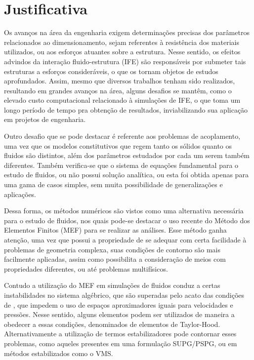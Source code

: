 \section{Justificativa}

Os avanços na área da engenharia exigem determinações precisas dos parâmetros relacionados ao dimensionamento, sejam referentes à resistência dos materiais utilizados, ou aos esforços atuantes sobre a estrutura. Nesse sentido, os efeitos advindos da interação fluido-estrutura (IFE) são responsáveis por submeter tais estruturas a esforços consideráveis, o que os tornam objetos de estudos aprofundados. Assim, mesmo que diversos trabalhos tenham sido realizados, resultando em grandes avanços na área, alguns desafios se mantêm, como o elevado custo computacional relacionado à simulações de IFE, o que toma um longo período de tempo pra obtenção de resultados, inviabilizando sua aplicação em projetos de engenharia.

Outro desafio que se pode destacar é referente aos problemas de acoplamento, uma vez que os modelos constitutivos que regem tanto os sólidos quanto os fluidos são distintos, além dos parâmetros estudados por cada um serem também diferentes. Também verifica-se que o sistema de equações fundamental para o estudo de fluidos, ou não possui solução analítica, ou esta foi obtida apenas para uma gama de casos simples, sem muita possibilidade de generalizações e aplicações.

Dessa forma, os métodos numéricos são vistos como uma alternativa necessária para o estudo de fluidos, nos quais pode-se destacar o uso recente do Método dos Elementos Finitos (MEF) para se realizar as análises. Esse método ganha atenção, uma vez que possui a propriedade de se adequar com certa facilidade à problemas de geometria complexa, suas condições de contorno são mais facilmente aplicadas, assim como possibilita a consideração de meios com propriedades diferentes, ou até problemas multifísicos.

Contudo a utilização do MEF em simulações de fluidos conduz a certas instabilidades no sistema algébrico, que são superadas pelo acato das condições de \LBB, que impedem o uso de espaços aproximadores iguais para velocidades e pressões. Nesse sentido, alguns elementos podem ser utilizados de maneira a obedecer a essas condições, denominados de elementos de Taylor-Hood. Alternativamente a utilização de termos estabilizadores pode contornar esses problemas, como aqueles presentes em uma formulação SUPG/PSPG, ou em métodos estabilizados como o VMS.

